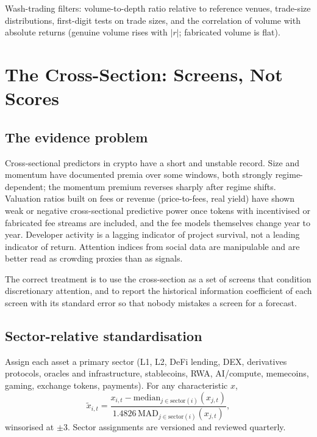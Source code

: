 \documentclass[11pt,a4paper]{article}
\theoremstyle{definition}
\begin{document}
Wash-trading filters: volume-to-depth ratio relative to reference venues, trade-size distributions, first-digit tests on trade sizes, and the correlation of volume with absolute returns (genuine volume rises with $|r|$; fabricated volume is flat).

\section{The Cross-Section: Screens, Not Scores}\label{sec:crosssection}

\subsection{The evidence problem}

Cross-sectional predictors in crypto have a short and unstable record. Size and momentum have documented premia over some windows, both strongly regime-dependent; the momentum premium reverses sharply after regime shifts. Valuation ratios built on fees or revenue (price-to-fees, real yield) have shown weak or negative cross-sectional predictive power once tokens with incentivised or fabricated fee streams are included, and the fee models themselves change year to year. Developer activity is a lagging indicator of project survival, not a leading indicator of return. Attention indices from social data are manipulable and are better read as crowding proxies than as signals.

The correct treatment is to use the cross-section as a set of screens that condition discretionary attention, and to report the historical information coefficient of each screen with its standard error so that nobody mistakes a screen for a forecast.

\subsection{Sector-relative standardisation}

Assign each asset a primary sector (L1, L2, DeFi lending, DEX, derivatives protocols, oracles and infrastructure, stablecoins, RWA, AI/compute, memecoins, gaming, exchange tokens, payments). For any characteristic $x$,
\begin{equation}
\tilde{x}_{i,t} = \frac{x_{i,t} - \mathrm{median}_{j\in\mathrm{sector}(i)}(x_{j,t})}{1.4826\,\mathrm{MAD}_{j\in\mathrm{sector}(i)}(x_{j,t})},
\end{equation}
winsorised at $\pm 3$. Sector assignments are versioned and reviewed quarterly.
\end{document}

